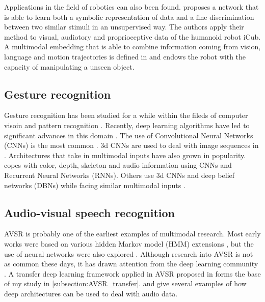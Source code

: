 Applications in the field of robotics can also been found.
\cite{A. Droniou 2014} proposes a network that is able to learn both
a symbolic representation of data and a fine discrimination between
two similar stimuli in an unsupervised way. The authors apply their method
to visual, audiotory and proprioceptive data of the humanoid robot iCub.
A multimodal embedding that is able to combine information coming from
vision, language and motion trajectories is defined in \cite{J. Sung 2017}
and endows the robot with the capacity of manipulating a unseen object.

\subsection{Gesture recognition}

Gesture recognition has been studied for a while within the fileds of
computer visoin and pattern recognition
\cite{T. Starner 1998, S. Mitra 2007}.
Recently, deep learning algorithms have led to
significant advances in this domain \cite{M. Asadi-Aghbolaghi 2017}.
The use of Convolutional Neural Networks (CNNs) is the most common
\cite{J. Nagi 2011}. 3d CNNs are used to deal with image sequences in
\cite{P. Molchanov 2015}. Architectures that take in multimodal inputs
have also grown in popularity. \cite{N. Neverova 2013} copes with color,
depth, skeleton and audio information using CNNs and Recurrent
Neural Networks (RNNs). Others use 3d CNNs and deep belief networks
(DBNs) while facing similar multimodal inputs
\cite{N. Neverova 2014, L. Pigou 2014, D. Wu 2016}.

\subsection{Audio-visual speech recognition}

AVSR is probably one of the earliest examples of multimodal research.
Most early works were based on various hidden Markov model (HMM) extensions
\cite{G. Potamianos 2004}, but the use of neural networks were also
explored \cite{C. Bregler 1994, B. P. Yuhas 1989}. Although research
into AVSR is not as common these days, it has drawn attention from the
deep learning community
\cite{J. Ngiam 2011, K. Noda 2014, A. K. Katsaggelos 2015}.
A transfer deep learning framework applied in AVSR proposed in
\cite{S. Moon 2015} forms the base of my study in
\ref{subsection:AVSR_transfer}. \cite{L. Deng 2013} and
\cite{G. Hinton 2012} give several examples of how deep architectures can
be used to deal with audio data.

